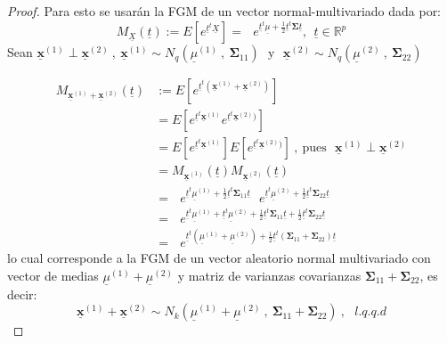 \documentclass[
]{book}
\theoremstyle{definition}
\theoremstyle{definition}
\theoremstyle{definition}
\theoremstyle{definition}
\theoremstyle{remark}
\begin{document}
\begin{proof}
Para esto se usarán la FGM de un vector normal-multivariado dada por:
\[
M_{\underline{X}}(\underline{t}):=E[e^{\underline{t}^t\underline{X}}]={\text{ $e$}}^{\underline{t}^t\underline{\mu} +\frac{1}{2}\underline{t}^t\mathbf{\Sigma}\underline{t}}, \ \ \underline{t} \in \mathbb{R}^p
\]
Sean \(\underline{\mathbf{x}}^{(1)} \perp \underline{\mathbf{x}}^{(2)}\ , \  \underline{\mathbf{x}}^{(1)} \sim N_q\left(\underline{\mu}^{(1)}\ , \ \mathbf{\Sigma}_{11}\right) \ \ \ \text{y} \ \ \ \underline{\mathbf{x}}^{(2)} \sim N_q\left(\underline{\mu}^{(2)}\ , \ \mathbf{\Sigma}_{22}\right)\)

\begin{align*}
M_{\underline{\mathbf{x}}^{(1)}+\underline{\mathbf{x}}^{(2)}}(\underline{t})&:=E\left[e^{\underline{t}^t
\left(\underline{\mathbf{x}}^{(1)}+\underline{\mathbf{x}}^{(2)}\right)} \right]\\
&=E\left[e^{\underline{t}^t\underline{\mathbf{x}}^{(1)}}
e^{\underline{t}^t\underline{\mathbf{x}}^{(2)})} \right]\\
&=E\left[e^{\underline{t}^t\underline{\mathbf{x}}^{(1)}}\right] E\left[
e^{\underline{t}^t\underline{\mathbf{x}}^{(2)})} \right]\ , \ \text{pues}\ \  \ \underline{\mathbf{x}}^{(1)} \perp \underline{\mathbf{x}}^{(2)}\\
&=M_{\underline{\mathbf{x}}^{(1)}}(\underline{t})M_{\underline{\mathbf{x}}^{(2)}}(\underline{t})\\
&={\text{ $e$}}^{\underline{t}^t\underline{\mu}^{(1)} +\frac{1}{2}\underline{t}^t\mathbf{\Sigma}_{11}\underline{t}}{\text{ $e$}}^{\underline{t}^t\underline{\mu}^{(2)} +\frac{1}{2}\underline{t}^t\mathbf{\Sigma}_{22}\underline{t}}\\
&={\text{ $e$}}^{\underline{t}^t\underline{\mu}^{(1)}+{\underline{t}^t\underline{\mu}^{(2)} +\frac{1}{2}\underline{t}^t\mathbf{\Sigma}_{11}\underline{t}} +\frac{1}{2}\underline{t}^t\mathbf{\Sigma}_{22}\underline{t}}\\
&={\text{ $e$}}^{\underline{t}^t \left( \underline{\mu}^{(1)}+\underline{\mu}^{(2)}\right) +\frac{1}{2}\underline{t}^t  \left( \mathbf{\Sigma}_{11}+\mathbf{\Sigma}_{22}\right)\underline{t}}
\end{align*}
lo cual corresponde a la FGM de un vector aleatorio normal multivariado con vector de medias \(\underline{\mu}^{(1)}+\underline{\mu}^{(2)}\) y matriz de varianzas covarianzas \(\mathbf{\Sigma}_{11}+\mathbf{\Sigma}_{22}\), es decir:
\[
\underline{\mathbf{x}}^{(1)}+\underline{\mathbf{x}}^{(2)} \sim N_{k} \left(\underline{\mu}^{(1)}+\underline{\mu}^{(2)} \ , \ \mathbf{\Sigma}_{11}+\mathbf{\Sigma}_{22} \right)\ , \ \ \ l.q.q.d
\]
\end{proof}
\end{document}
